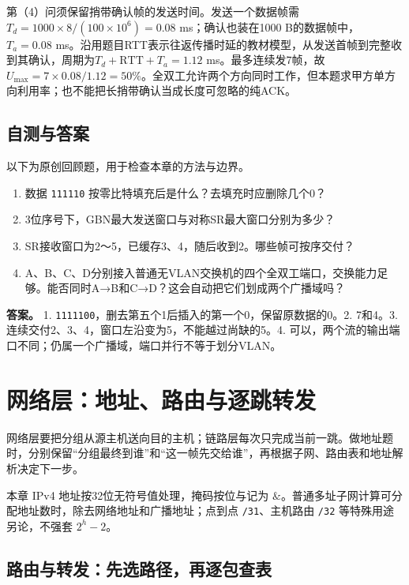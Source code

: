 第（4）问须保留捎带确认帧的发送时间。发送一个数据帧需\(T_d=1000\times8/(100\times10^6)=0.08\) ms；确认也装在1000 B的数据帧中，\(T_a=0.08\) ms。沿用题目RTT表示往返传播时延的教材模型，从发送首帧到完整收到其确认，周期为\(T_d+\mathrm{RTT}+T_a=1.12\) ms。最多连续发7帧，故\(U_{\max}=7\times0.08/1.12=50\%\)。全双工允许两个方向同时工作，但本题求甲方单方向利用率；也不能把长捎带确认当成长度可忽略的纯ACK。

\section{自测与答案}\label{cn-ch3-review}

以下为原创回顾题，用于检查本章的方法与边界。

\begin{enumerate}
\def\labelenumi{\arabic{enumi}.}
\tightlist
\item
  数据 \texttt{111110} 按零比特填充后是什么？去填充时应删除几个0？
\item
  3位序号下，GBN最大发送窗口与对称SR最大窗口分别为多少？
\item
  SR接收窗口为2～5，已缓存3、4，随后收到2。哪些帧可按序交付？
\item
  A、B、C、D分别接入普通无VLAN交换机的四个全双工端口，交换能力足够。能否同时A→B和C→D？这会自动把它们划成两个广播域吗？
\end{enumerate}

\textbf{答案。} 1. \texttt{1111100}，删去第五个1后插入的第一个0，保留原数据的0。2. 7和4。3. 连续交付2、3、4，窗口左沿变为5，不能越过尚缺的5。4. 可以，两个流的输出端口不同；仍属一个广播域，端口并行不等于划分VLAN。

\chapter{网络层：地址、路由与逐跳转发}\label{cn-ch4}

网络层要把分组从源主机送向目的主机；链路层每次只完成当前一跳。做地址题时，分别保留``分组最终到谁''和``这一帧先交给谁''，再根据子网、路由表和地址解析决定下一步。

本章 IPv4 地址按32位无符号值处理，掩码按位与记为 \(\&\)。普通多址子网计算可分配地址数时，除去网络地址和广播地址；点到点 \texttt{/31}、主机路由 \texttt{/32} 等特殊用途另论，不强套 \(2^h-2\)。

\section{路由与转发：先选路径，再逐包查表}\label{cn-04-01}


